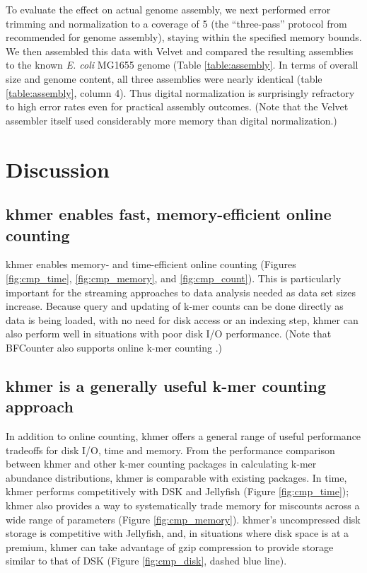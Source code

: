 \documentclass[10pt]{article}
\begin{document}
To evaluate the effect on actual genome assembly, we next performed
error trimming and normalization to a coverage of 5 (the
``three-pass'' protocol from \cite{Brown2012} recommended for
genome assembly), staying within the specified memory bounds.  We then
assembled this data with Velvet \cite{Zerbino2008} and compared the resulting 
assemblies to the known {\em E. coli} MG1655 genome (Table \ref{table:assembly}. 
In terms of overall size and genome content, all three assemblies were nearly identical 
(table \ref{table:assembly}, column 4).  Thus digital normalization is surprisingly 
refractory to high error rates even for practical assembly outcomes.  (Note that
the Velvet assembler itself used considerably more memory than digital
normalization.)







\section*{Discussion}


\subsection*{khmer enables fast, memory-efficient online counting}

khmer enables memory- and time-efficient online counting (Figures \ref{fig:cmp_time}, 
\ref{fig:cmp_memory}, and \ref{fig:cmp_count}).  This is
particularly important for the streaming approaches to data analysis
needed as data set sizes increase.  Because query and updating of
k-mer counts can be done directly as data is being loaded, with no
need for disk access or an indexing step, khmer can also perform
well in situations with poor disk I/O performance.  (Note that BFCounter
also supports online k-mer counting \cite{Melsted2011}.)

\subsection*{khmer is a generally useful k-mer counting approach}

In addition to online counting, khmer offers a general range of useful
performance tradeoffs for disk I/O, time and memory.  From the
performance comparison between khmer and other k-mer counting packages
in calculating k-mer abundance distributions, khmer is comparable with
existing packages.  In time, khmer performs competitively with DSK and
Jellyfish (Figure \ref{fig:cmp_time}); khmer also provides a way to systematically trade 
memory for miscounts across a wide range of parameters (Figure \ref{fig:cmp_memory}).  khmer's
uncompressed disk storage is competitive with Jellyfish, and, in
situations where disk space is at a premium, khmer can take advantage
of gzip compression to provide storage similar to that of DSK (Figure \ref{fig:cmp_disk}, 
dashed blue line).
\end{document}
